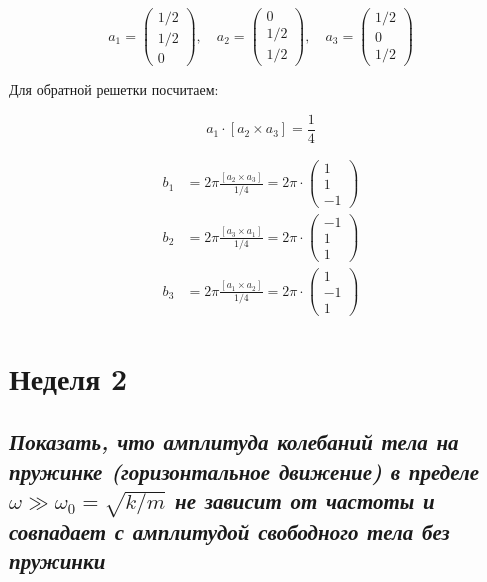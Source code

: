 \documentclass[a4paper, 12pt]{article}
\begin{document}
\begin{equation}
	a_1 = 
	\begin{pmatrix}
		1/2 \\ 1/2 \\ 0
	\end{pmatrix}, \quad
	a_2 = 
	\begin{pmatrix}
		0 \\ 1/2 \\ 1/2
	\end{pmatrix}, \quad
	a_3 = 
	\begin{pmatrix}
		1/2 \\ 0 \\ 1/2
	\end{pmatrix}	
\end{equation}

Для обратной решетки посчитаем:

\begin{equation}
	a_1 \cdot [a_2 \times a_3] =  \frac{1}{4}
\end{equation}

\begin{align}
	b_1 &= 2\pi \frac{[a_2 \times a_3]}{1/4} = 2\pi \cdot
	\begin{pmatrix}
		1 \\ 1 \\ -1
	\end{pmatrix}\\
	b_2 &= 2\pi \frac{[a_3 \times a_1]}{1/4} = 2\pi \cdot
	\begin{pmatrix}
		-1 \\ 1 \\ 1
	\end{pmatrix}\\
	b_3 &= 2\pi \frac{[a_1 \times a_2]}{1/4} = 2\pi \cdot
	\begin{pmatrix}
		1 \\ -1 \\ 1
	\end{pmatrix}
\end{align}

\newpage

\section{Неделя 2}

\subsection{\textit{Показать, что амплитуда колебаний тела на пружинке (горизонтальное движение) в пределе $\omega \gg \omega_0 = \sqrt{k/m}$ не зависит от частоты и совпадает с амплитудой свободного тела без пружинки}}
\end{document}
